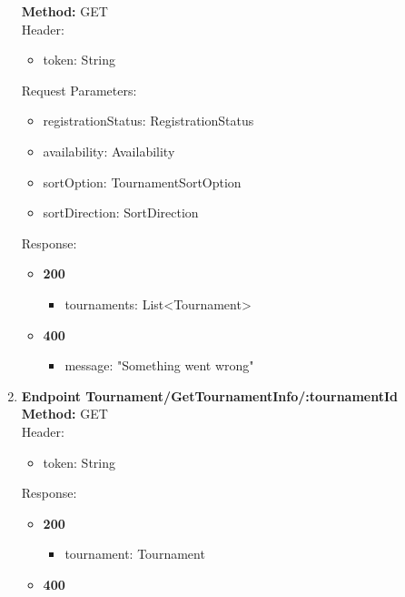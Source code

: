 \begin{enumerate}
    \textbf{Method:} GET \\
    Header:\\
    \begin{itemize}
        \item token: String
    \end{itemize}
    Request Parameters: \\
    \begin{itemize}
        \item registrationStatus: RegistrationStatus
        \item availability: Availability
        \item sortOption: TournamentSortOption
        \item sortDirection: SortDirection
    \end{itemize}
    Response:\\
    \begin{itemize}
        \item \textbf{200} \\
        \begin{itemize}
            \item tournaments: List<Tournament>
        \end{itemize}
        \item \textbf{400} \\
        \begin{itemize}
            \item message: "Something went wrong"
        \end{itemize}
    \end{itemize}
    \item \textbf{Endpoint Tournament/GetTournamentInfo/:tournamentId} \\
    \textbf{Method:} GET \\
    Header:\\
    \begin{itemize}
        \item token: String
    \end{itemize}
    Response:\\
    \begin{itemize}
        \item \textbf{200} \\
        \begin{itemize}
            \item tournament: Tournament
        \end{itemize}
        \item \textbf{400} \\

\end{itemize}
\end{enumerate}
